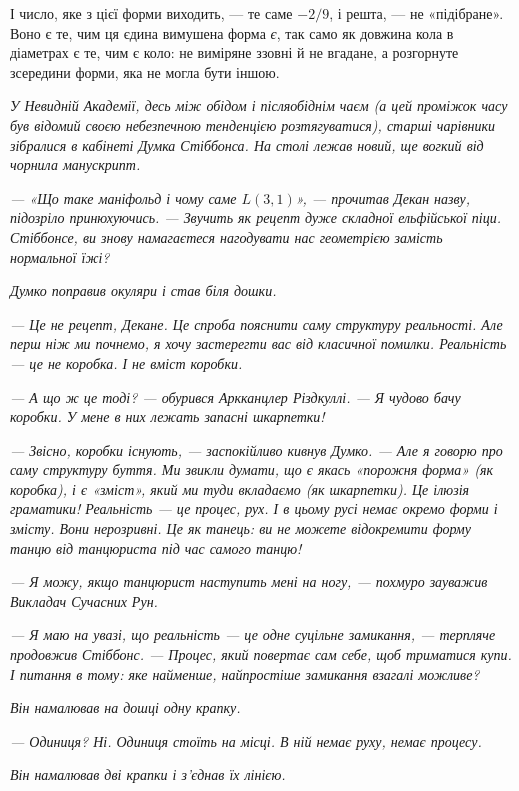 \documentclass[12pt, a4paper, openany]{book}
\begin{document}
І число, яке з цієї форми виходить, --- те саме $-2/9$, і решта, --- не «підібране». Воно є те, чим ця єдина вимушена форма \emph{є}, так само як довжина кола в діаметрах є те, чим є коло: не виміряне ззовні й не вгадане, а розгорнуте зсередини форми, яка не могла бути іншою.

\begin{terrybox}
\textit{У Невидній Академії, десь між обідом і післяобіднім чаєм (а цей проміжок часу був відомий своєю небезпечною тенденцією розтягуватися), старші чарівники зібралися в кабінеті Думка Стіббонса. На столі лежав новий, ще вогкий від чорнила манускрипт.}

\textit{--- «Що таке маніфольд і чому саме $L(3,1)$», --- прочитав Декан назву, підозріло принюхуючись. --- Звучить як рецепт дуже складної ельфійської піци. Стіббонсе, ви знову намагаєтеся нагодувати нас геометрією замість нормальної їжі?}

\textit{Думко поправив окуляри і став біля дошки.}

\textit{--- Це не рецепт, Декане. Це спроба пояснити саму структуру реальності. Але перш ніж ми почнемо, я хочу застерегти вас від класичної помилки. Реальність --- це не коробка. І не вміст коробки.}

\textit{--- А що ж це тоді? --- обурився Аркканцлер Різдкуллі. --- Я чудово бачу коробки. У мене в них лежать запасні шкарпетки!}

\textit{--- Звісно, коробки існують, --- заспокійливо кивнув Думко. --- Але я говорю про саму структуру буття. Ми звикли думати, що є якась «порожня форма» (як коробка), і є «зміст», який ми туди вкладаємо (як шкарпетки). Це ілюзія граматики! Реальність --- це процес, рух. І в цьому русі немає окремо форми і змісту. Вони нерозривні. Це як танець: ви не можете відокремити форму танцю від танцюриста під час самого танцю!}

\textit{--- Я можу, якщо танцюрист наступить мені на ногу, --- похмуро зауважив Викладач Сучасних Рун.}

\textit{--- Я маю на увазі, що реальність --- це одне суцільне замикання, --- терпляче продовжив Стіббонс. --- Процес, який повертає сам себе, щоб триматися купи. І питання в тому: яке найменше, найпростіше замикання взагалі можливе?}

\textit{Він намалював на дошці одну крапку.}

\textit{--- Одиниця? Ні. Одиниця стоїть на місці. В ній немає руху, немає процесу.}

\textit{Він намалював дві крапки і з'єднав їх лінією.}


\end{terrybox}
\end{document}
